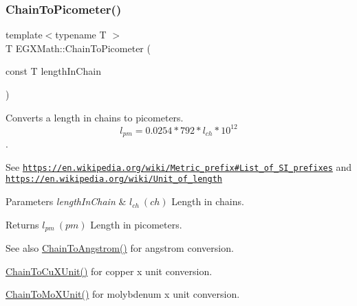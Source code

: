 \subsubsection{\texorpdfstring{Chain\+To\+Picometer()}{ChainToPicometer()}}
{\footnotesize\ttfamily template$<$typename T $>$ \\
T E\+G\+X\+Math\+::\+Chain\+To\+Picometer (\begin{DoxyParamCaption}\item[{const T}]{length\+In\+Chain }\end{DoxyParamCaption})}



Converts a length in chains to picometers. \[ l_{pm}=0.0254 * 792 * l_{ch} * 10^{12} \]. 

See \href{https://en.wikipedia.org/wiki/Metric_prefix#List_of_SI_prefixes}{\tt https\+://en.\+wikipedia.\+org/wiki/\+Metric\+\_\+prefix\#\+List\+\_\+of\+\_\+\+S\+I\+\_\+prefixes} and \href{https://en.wikipedia.org/wiki/Unit_of_length}{\tt https\+://en.\+wikipedia.\+org/wiki/\+Unit\+\_\+of\+\_\+length} 
\begin{DoxyParams}{Parameters}
{\em length\+In\+Chain} & $ l_{ch}\ (ch)$ Length in chains. \\
\hline
\end{DoxyParams}
\begin{DoxyReturn}{Returns}
$ l_{pm}\ (pm)$ Length in picometers. 
\end{DoxyReturn}
\begin{DoxySeeAlso}{See also}
\mbox{\hyperlink{group___e_g_x_math-_conversions-_length_conversions-_imperial-_chain-_non-_s_i_ga89e870762310908510aad80d26dc1942}{Chain\+To\+Angstrom()}} for angstrom conversion. 

\mbox{\hyperlink{group___e_g_x_math-_conversions-_length_conversions-_imperial-_chain-_non-_s_i_ga4d49e29ef32b64b7a433ffe76447cf5f}{Chain\+To\+Cu\+X\+Unit()}} for copper x unit conversion. 

\mbox{\hyperlink{group___e_g_x_math-_conversions-_length_conversions-_imperial-_chain-_non-_s_i_gae4a2b99d846db53416e9fc5d6f9e957c}{Chain\+To\+Mo\+X\+Unit()}} for molybdenum x unit conversion. 
\end{DoxySeeAlso}
\mbox{\label{group___e_g_x_math-_conversions-_length_conversions-_imperial-_chain-_s_i_ga8940f5211af58a3bf708412ad2d7ba96}} 
